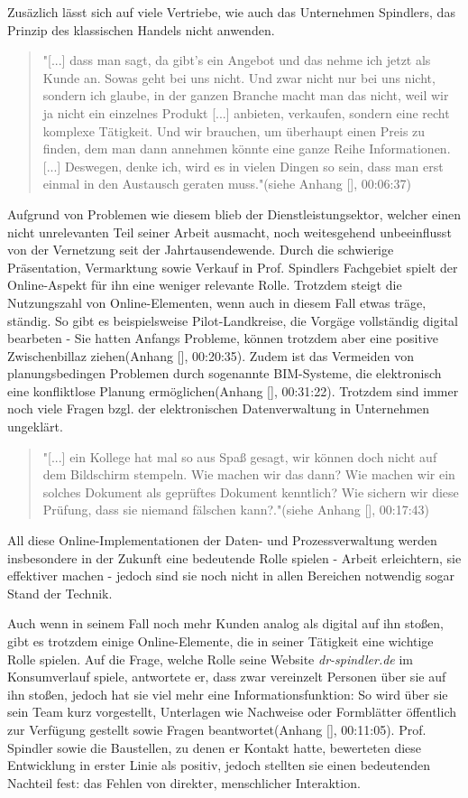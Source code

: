 \begin{folding}
Zusäzlich lässt sich auf viele Vertriebe, wie auch das Unternehmen Spindlers, das Prinzip des klassischen Handels nicht anwenden. 

\begin{quote}
"[...] dass man sagt, da gibt's ein Angebot und das nehme ich jetzt als Kunde an. Sowas geht bei uns nicht. Und zwar nicht nur bei uns nicht, sondern ich glaube, in der ganzen Branche macht man das nicht, weil wir ja nicht ein einzelnes Produkt [...] anbieten, verkaufen, sondern eine recht komplexe Tätigkeit. Und wir brauchen, um überhaupt einen Preis zu finden, dem man dann annehmen könnte eine ganze Reihe Informationen. [...] Deswegen, denke ich, wird es in vielen Dingen so sein, dass man erst einmal in den Austausch geraten muss."(siehe Anhang [], 00:06:37)
\end{quote} 
Aufgrund von Problemen wie diesem blieb der Dienstleistungsektor, welcher einen nicht unrelevanten Teil seiner Arbeit ausmacht, noch weitesgehend unbeeinflusst von der Vernetzung seit der Jahrtausendewende. Durch die schwierige Präsentation, Vermarktung sowie Verkauf in Prof. Spindlers Fachgebiet spielt der Online-Aspekt für ihn eine weniger relevante Rolle. Trotzdem steigt die Nutzungszahl von Online-Elementen, wenn auch in diesem Fall etwas träge, ständig. So gibt es beispielsweise Pilot-Landkreise, die Vorgäge vollständig digital bearbeten - Sie hatten Anfangs Probleme, können trotzdem aber eine positive Zwischenbillaz ziehen(Anhang [], 00:20:35). Zudem ist das Vermeiden von planungsbedingen Problemen durch sogenannte \ac{BIM}-Systeme, die elektronisch eine konfliktlose Planung ermöglichen(Anhang [], 00:31:22). Trotzdem sind immer noch viele Fragen bzgl. der elektronischen Datenverwaltung in Unternehmen ungeklärt.

\begin{quote}
"[...] ein Kollege hat mal so aus Spaß gesagt, wir können doch nicht auf dem Bildschirm stempeln. Wie machen wir das dann? Wie machen wir ein solches Dokument als geprüftes Dokument kenntlich? Wie sichern wir diese Prüfung, dass sie niemand fälschen kann?."(siehe Anhang [], 00:17:43)
\end{quote} 
All diese Online-Implementationen der Daten- und Prozessverwaltung werden insbesondere in der Zukunft eine bedeutende Rolle spielen - Arbeit erleichtern, sie effektiver machen - jedoch sind sie noch nicht in allen Bereichen notwendig sogar Stand der Technik.

Auch wenn in seinem Fall noch mehr Kunden analog als digital auf ihn stoßen, gibt es trotzdem einige Online-Elemente, die in seiner Tätigkeit eine wichtige Rolle spielen. Auf die Frage, welche Rolle seine Website \emph{dr-spindler.de} im Konsumverlauf spiele, antwortete er, dass zwar vereinzelt Personen über sie auf ihn stoßen, jedoch hat sie viel mehr eine Informationsfunktion: So wird über sie sein Team kurz vorgestellt, Unterlagen wie Nachweise oder Formblätter öffentlich zur Verfügung gestellt sowie Fragen beantwortet(Anhang [], 00:11:05). Prof. Spindler sowie die Baustellen, zu denen er Kontakt hatte, bewerteten diese Entwicklung in erster Linie als positiv, jedoch stellten sie einen bedeutenden Nachteil fest: das Fehlen von direkter, menschlicher Interaktion. 


\end{folding}
